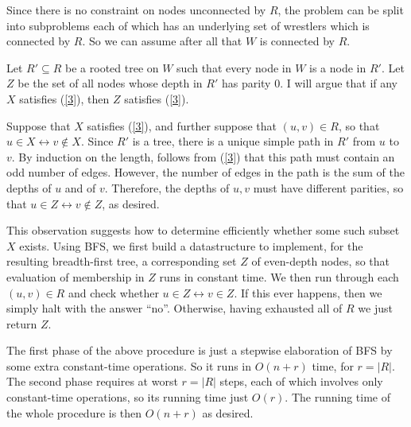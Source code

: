 \documentclass[
]{article}
\begin{document}
Since there is no constraint on nodes unconnected by $R$, the problem can be split into subproblems each of which has an underlying set of wrestlers which is connected by $R$.  So we can assume after all that $W$ is connected by $R$.

Let $R'\subseteq R$ be a rooted tree on $W$
such that every node in $W$ is a node in $R'$.
Let $Z$ be the set of all nodes whose depth in $R'$ has parity $0$.
I will argue that if any $X$ satisfies (\ref{3}), 
then $Z$ satisfies (\ref{3}).

Suppose that $X$ satisfies (\ref{3}),
and further suppose that $(u,v)\in R$,
so that $u\in X\leftrightarrow v\not\in X$.
Since $R'$ is a tree, there is a unique simple path in $R'$ from $u$ to $v$.
By induction on the length, follows from (\ref{3}) that this path must contain an odd number of edges.
However, the number of edges in the path is the sum of the depths of $u$ and of $v$.
Therefore, the depths of $u,v$ must have different parities, so that $u\in Z\leftrightarrow v\not \in Z$, as desired.

This observation suggests how to determine efficiently whether some such subset $X$ exists. Using BFS, we first build a datastructure to implement, for the resulting breadth-first tree, a corresponding set $Z$ of even-depth nodes, so that evaluation of membership in $Z$ runs in constant time.  We then run through each $(u,v)\in R$ and check whether $u\in Z\leftrightarrow v \in Z$.  If this ever happens, then we simply halt with the answer ``no''.  Otherwise, having exhausted all of $R$ we just return $Z$.

The first phase of the above procedure is just a stepwise elaboration of BFS by some extra constant-time operations. So it runs in $O(n+r)$ time, for $r=|R|$.  The second phase requires at worst $r=|R|$ steps, each of which involves only constant-time operations, so its running time just $O(r)$.  The running time of the whole procedure is then $O(n+r)$ as desired.
\end{document}
